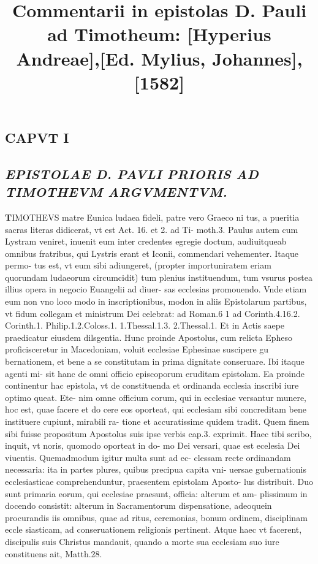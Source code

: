 \documentclass{article}
\begin{document}
\date{}
        \title{Commentarii in epistolas D. Pauli ad Timotheum: [Hyperius Andreae],[Ed. Mylius, Johannes], [1582]}
\maketitle
\tableofcontents
\clearpage
\begin{pages} 
\beginnumbering
        
\marginpar{[ p.1 ]}
\endnumbering\beginnumbering\section{CAPVT I}
{}
\subsection*{\textit{EPISTOLAE D. PAVLI PRIORIS AD TIMOTHEVM ARGVMENTVM. }}\pstart \huge\textbf{T}\normalsize IMOTHEVS matre Eunica ludaea fideli, patre vero Graeco ni tus, a pueritia sacras literas didicerat, vt est Act. 16. et 2. ad Ti- moth.3. Paulus autem cum Lystram veniret, inuenit eum inter credentes egregie doctum, audiuitqueab omnibus fratribus, qui Lystris erant et Iconii, commendari vehementer. Itaque  permo- tus est, vt eum sibi adiungeret, (propter importuniratem eriam quorundam ludaeorum circumcidit) tum plenius instituendum, tum vsurus postea illius opera in negocio Euangelii ad diuer- sas ecclesias promouendo. Vnde etiam eum non vno loco modo in inscriptionibus, modon in aliis Epistolarum partibus, vt fidum collegam et ministrum Dei celebrat: ad Roman.6 1 ad Corinth.4.16.2. Corinth.1. Philip.1.2.Coloss.1. 1.Thessal.1.3. 2.Thessal.1. Et in Actis saepe praedicatur eiusdem dilsgentia. Hunc proinde Apostolus, cum relicta Epheso proficisceretur in Macedoniam, voluit ecclesiae Ephesinae suscipere gu bernationem, et bene a se constitutam in prima dignitate conseruare. Ibi itaque  agenti mi- sit hanc de omni officio episcoporum eruditam epistolam. Ea proinde continentur hac epistola, vt de constituenda et ordinanda ecclesia inscribi iure optimo queat. Ete- nim omne officium corum, qui in ecclesiae versantur munere, hoc est, quae facere et do cere eos oporteat, qui ecclesiam sibi concreditam bene instituere cupiunt, mirabili ra- tione et accuratissime quidem tradit. Quem finem sibi fuisse propositum Apostolus suis ipse verbis cap.3. exprimit. Haec tibi scribo, inquit, vt noris, quomodo oporteat in do- mo Dei versari, quae est ecelesia Dei viuentis. Quemadmodum igitur multa sunt ad ec- clessam recte ordinandam necessaria: ita in partes plures, quibus precipua capita vni- uersae gubernationis ecclesiasticae comprehenduntur, praesentem epistolam Aposto- lus distribuit. Duo sunt primaria eorum, qui ecclesiae praesunt, officia: alterum et am- plissimum in docendo consistit: alterum in Sacramentorum dispensatione, adeoquein procurandis iis omnibus, quae ad ritus, ceremonias, bonum ordinem, disciplinam eccle siasticam, ad conseruationem religionis pertinent. Atque  haec vt facerent, discipulis suis Christus mandauit, quando a morte sua ecclesiam suo iure constituens ait, Matth.28.  \pend\pstart 
\end{pages}
\end{document}
